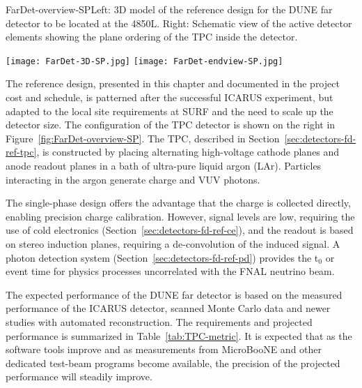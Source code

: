 \begin{cdrfigure}{FarDet-overview-SP}{Left: 3D model of the reference design for the DUNE far detector to be located at the 4850L. Right: Schematic view of the active detector elements showing the plane ordering of the TPC inside the detector.}
\centering
\begin{minipage}[b]{1.0\textwidth}
\begin{center}
\texttt{[image: FarDet-3D-SP.jpg]}
\texttt{[image: FarDet-endview-SP.jpg]}
\end{center}
\end{minipage}
\end{cdrfigure}

The reference design, presented in this chapter and documented in the project cost and schedule, is  
patterned after the successful ICARUS experiment, but adapted to the local site requirements at SURF and the need to scale up the detector size. The configuration of the TPC detector is shown on the right in Figure~\ref{fig:FarDet-overview-SP}.  The TPC, described in Section~\ref{sec:detectors-fd-ref-tpc}, is constructed by placing alternating high-voltage cathode planes and anode readout planes in a bath of ultra-pure liquid argon (LAr). Particles interacting in the argon generate charge and VUV photons. 


The single-phase design offers the advantage that the charge is collected directly, enabling precision charge calibration. However, signal levels are low, requiring the use of cold electronics (Section~\ref{sec:detectors-fd-ref-ce}), and the readout is based on stereo induction planes, requiring a de-convolution of the induced signal. A photon detection system (Section~\ref{sec:detectors-fd-ref-pd}) provides the t$_0$ or event time for physics processes uncorrelated with the FNAL neutrino beam.



The expected performance of the DUNE far detector is based on the measured performance of the ICARUS detector, scanned Monte Carlo data and newer studies with automated reconstruction. The requirements and projected performance is summarized in Table~\ref{tab:TPC-metric}. It is expected that as the software tools improve and as measurements from MicroBooNE and other dedicated test-beam programs become available, the precision of the projected performance will steadily improve.


